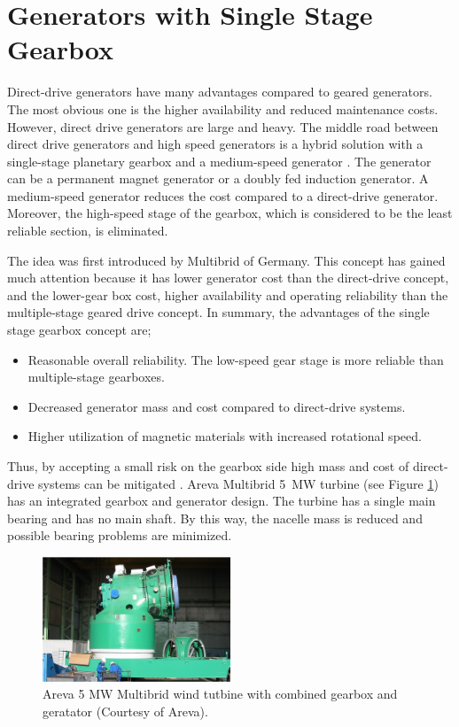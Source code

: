 \documentclass[a4paper, 11pt]{article} %
\begin{document}
\section{Generators with Single Stage Gearbox}

Direct-drive generators have many advantages compared to geared generators. The most obvious one is the higher availability and reduced maintenance costs. However, direct drive generators are large and heavy. The middle road between direct drive generators and high speed generators is a hybrid solution with a single-stage planetary gearbox and a medium-speed generator \cite{Li2009}. The generator can be a permanent magnet generator or a doubly fed induction generator. A medium-speed generator reduces the cost compared to a direct-drive generator. Moreover, the high-speed stage of the gearbox, which is considered to be the least reliable section, is eliminated. 

The idea was first introduced by Multibrid of Germany. This concept has gained much attention because it has lower generator cost than the direct-drive concept, and the lower-gear box cost, higher availability and operating reliability than the multiple-stage geared drive concept. In summary, the advantages of the single stage gearbox concept are;

\begin{itemize}
  \item Reasonable overall reliability. The low-speed gear stage is more reliable than multiple-stage gearboxes.
  \item Decreased generator mass and cost compared to direct-drive systems.
  \item Higher utilization of magnetic materials with increased rotational speed.
\end{itemize}

Thus, by accepting a small risk on the gearbox side high mass and cost of direct-drive systems can be mitigated \cite{Bohmeke2003}. Areva Multibrid 5~MW  turbine (see Figure \ref{multibrid}) has an integrated gearbox and generator design. The turbine has a single main bearing and has no main shaft. By this way, the nacelle mass is reduced and possible bearing problems are minimized. 

  \begin{figure}
    \centering
    \includegraphics[width=0.5\textwidth]{multibrid}
    \caption{Areva 5 MW Multibrid wind tutbine with combined gearbox and geratator (Courtesy of Areva).} 
    \label{multibrid}
  \end{figure}
\end{document}
